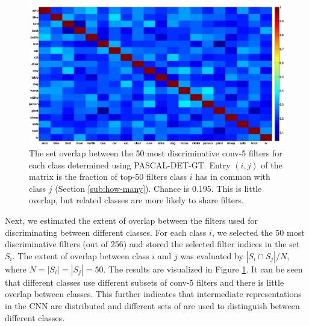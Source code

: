 \begin{figure}[t!]
\centering
\includegraphics[width=1.0\linewidth]{images/ftNet.png}
\caption{The set overlap between the 50 most discriminative conv-5 filters for each class determined using PASCAL-DET-GT.
Entry $(i, j)$ of the matrix is the fraction of top-50 filters class $i$ has in common with class $j$ (Section \ref{sub:how-many}). Chance is 0.195. This is little overlap, but related classes are more likely to share filters.}
\label{fig:overlap}
\end{figure}

Next, we estimated the extent of overlap between the filters used for discriminating between different classes.
For each class $i$, we selected the 50 most discriminative filters (out of 256) and stored the selected filter indices in the set $S_i$.
The extent of overlap between class $i$ and $j$ was evaluated by $|S_i \cap S_j| / N$,
where $N = |S_i| = |S_j| = 50$. The results are visualized in Figure \ref{fig:overlap}. It can be seen that different classes use different subsets of conv-5 filters and there is little overlap between classes. This further indicates that intermediate representations in the CNN are distributed and different sets of are used to distinguish between different classes. 

